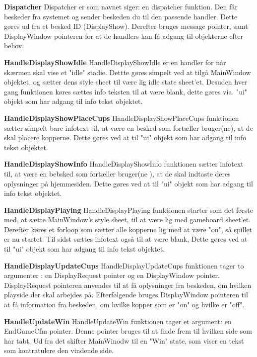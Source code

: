 \documentclass[Softwaredesign/Softwaredesign_main.tex]{subfiles}
\begin{document}
\textbf{Dispatcher} 
Dispatcher er som navnet siger: en dispatcher funktion. Den får beskeder fra systemet og sender beskeden du til den passende handler. Dette gøres ud fra et besked ID (DisplayShow). Derefter bruges message pointer, samt  DisplayWindow pointeren for at de handlers kan få adgang til objekterne efter behov.

\textbf{HandleDisplayShowIdle}
HandleDisplayShowIdle er en handler for når skærmen skal vise et "idle" stadie.  Dettte gøres simpelt ved at tilgå MainWindow objektet, og sætter dens style sheet til være lig  idle state sheet'et. Desuden hver gang funktionen køres sættes info teksten til at være blank, dette gøres via. "ui" objekt som har adgang til info tekst objektet. 

\textbf{HandleDisplayShowPlaceCups}
HandleDisplayShowPlaceCups funktionen sætter simpelt bare infotext til, at være en besked som fortæller bruger(ne), at de skal placere kopperne.  Dette gøres ved at til "ui" objekt som har adgang til info tekst objektet.

\textbf{HandleDisplayShowInfo}
HandleDisplayShowInfo funktionen sætter infotext til,  at være en bebsked som fortæller bruger(ne ), at de skal indtaste deres oplysninger på hjemmesiden. Dette gøres ved at til "ui" objekt som har adgang til info tekst objektet.

\textbf{HandleDisplayPlaying }
HandleDisplayPlaying funktionen starter som det første med, at sætte MainWindow's style sheet, til at være lig med gameboard sheet'et.  Derefter køres et forloop som sætter alle kopperne lig med at være "on", så spillet er nu startet. Til sidst sættes infotext også til at være blank,  Dette gøres ved at til "ui" objekt som har adgang til info tekst objektet. 

\textbf{HandleDisplayUpdateCups}
HandleDisplayUpdateCups funktionen tager to argumenter :  en DisplayRequest pointer og en DisplayWindow pointer.  DisplayRequest pointeren anvendes til at få oplysninger fra beskeden,  om hvilken playside der skal arbejdes på. Efterfølgende bruges DisplayWindow pointeren  til at få information fra beskeden, om hvilke kopper som er "on" og hvilke er "off". 

\textbf{HandleUpdateWin}
HandleUpdateWin funktionen tager et argument: en EndGameCfm pointer. Denne pointer bruges til at finde frem til hvilken side som har tabt. Ud fra det skifter MainWinodw til en "Win" state, som viser en tekst som kontratulere den vindende side.  
\end{document}
